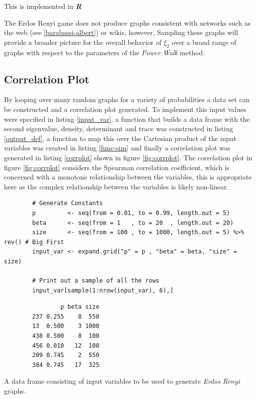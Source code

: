 \documentclass[11pt]{report}
\begin{document}
This is implemented in \textbf{\emph{R}} \cite[IgraphManualPagesa]{IgraphManualPages}

The Erdos Renyi game does not produce graphs consistent with networks such as
the web (see \ref{barabassi-albert}) or wikis, however, Sampling these graphs will
provide a broader picture for the overall behavior of \(\xi_{2}\) over a broad
range of graphs with respect to the parameters of the \emph{Power Walk} method.

\subsection{Correlation Plot}
\label{correlation-plot}
By looping over many random graphs for a variety of probabilities a data set can
be constructed and a correlation plot generated. To implement this input values
were specified in listing \ref{input_var}, a function that builds a data frame with
the second eigenvalue, density, determinant and trace was constructed in listing
\ref{output_def}, a function to map this over the Cartesian product of the input
variables was created in listing \ref{func-sim} and finally a correlation plot
was generated in listing \ref{corrplot} shown in figure \ref{fig:corrplot}. The
correlation plot in figure \ref{fig:corrplot} considers the Spearman correlation
coefficient, which is concerned with a monotone relationship between the
variables, this is appropriate here as the complex relationship between the
variables is likely non-linear.


\begin{listing}[htbp]
    \begin{tcolorbox}
        \begin{verbatim}
        # Generate Constants
        p         <- seq(from = 0.01, to = 0.99, length.out = 5)
        beta      <- seq(from = 1   , to = 20  , length.out = 20)
        size      <- seq(from = 100 , to = 1000, length.out = 5) %>% rev() # Big First
        input_var <- expand.grid("p" = p , "beta" = beta, "size" = size)

        # Print out a sample of all the rows
        input_var[sample(1:nrow(input_var), 6),]
        \end{verbatim}
    \tcblower
        \begin{verbatim}
                p beta size
        237 0.255    8  550
        13  0.500    3 1000
        438 0.500    8  100
        456 0.010   12  100
        209 0.745    2  550
        384 0.745   17  325
        \end{verbatim}
    \end{tcolorbox}
\caption{\label{input_var}A data frame consisting of input variables to be used to generate \emph{Erdos Renyi} graphs.}
\end{listing}
\end{document}
